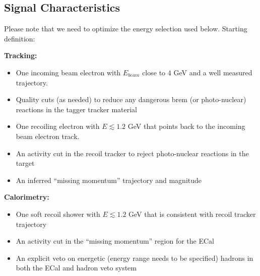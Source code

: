
\subsection{Signal Characteristics}

Please note that we need to optimize the energy selection used below. Starting
definition: 

\textbf{Tracking:} 
\begin{itemize}
    \item One incoming beam electron with $E_{beam}$ close to $4$ GeV and a well
          measured trajectory. 
    \item Quality cuts (as needed) to reduce any dangerous brem 
          (or photo-nuclear) reactions in the tagger tracker material
    \item One recoiling electron with $E\lesssim 1.2$ GeV that points back to 
          the incoming beam electron track. 
    \item An activity cut in the recoil tracker to reject photo-nuclear 
          reactions in the target
    \item An inferred ``missing momentum'' trajectory and magnitude 
\end{itemize}

\textbf{Calorimetry:}
\begin{itemize}
    \item One soft recoil shower with $E\lesssim 1.2$ GeV that is consistent 
          with recoil tracker trajectory
    \item An activity cut in the ``missing momentum'' region for the ECal
    \item An explicit veto on energetic (energy range needs to be specified)
          hadrons in both the ECal and hadron veto system 
\end{itemize}
